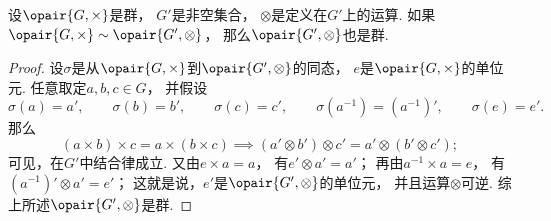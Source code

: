 \begin{theorem}\label{theorem:抽象代数.群的同态象是群}
设\(\opair{G,\times}\)是群，
\(G'\)是非空集合，
\(\otimes\)是定义在\(G'\)上的运算.
如果\(\opair{G,\times}\sim\opair{G',\otimes}\)，
那么\(\opair{G',\otimes}\)也是群.
\begin{proof}
设\(\sigma\)是从\(\opair{G,\times}\)到\(\opair{G',\otimes}\)的同态，
\(e\)是\(\opair{G,\times}\)的单位元.
任意取定\(a,b,c\in G\)，
并假设\[
	\sigma(a)=a', \qquad
	\sigma(b)=b', \qquad
	\sigma(c)=c', \qquad
	\sigma(a^{-1})=(a^{-1})', \qquad
	\sigma(e)=e'.
\]
那么\[
	(a \times b)\times c = a \times(b \times c)
	\implies
	(a' \otimes b')\otimes c' = a' \otimes(b' \otimes c');
\]
可见，在\(G'\)中结合律成立.
又由\(e\times a=a\)，
有\(e'\otimes a'=a'\)；
再由\(a^{-1}\times a=e\)，
有\((a^{-1})'\otimes a'=e'\)；
这就是说，\(e'\)是\(\opair{G',\otimes}\)的单位元，
并且运算\(\otimes\)可逆.
综上所述\(\opair{G',\otimes}\)是群.
\end{proof}
\end{theorem}
